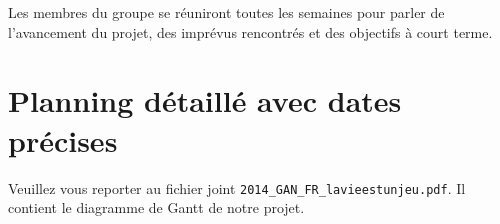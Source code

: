 \documentclass{life-fr}
\begin{document}
Les membres du groupe se réuniront toutes les semaines pour parler de l'avancement du projet, des imprévus rencontrés et des objectifs à court terme.

\section{Planning détaillé avec dates précises}

Veuillez vous reporter au fichier joint \texttt{2014\_GAN\_FR\_lavieestunjeu.pdf}. Il contient le diagramme de Gantt de notre projet.

\newpage
\hspace{2cm}
\newpage
\end{document}
